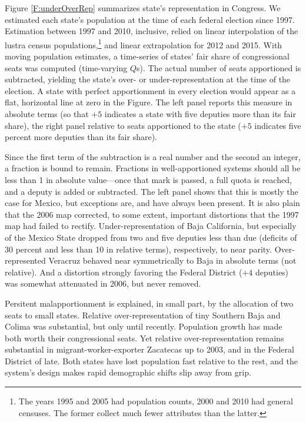 \documentclass[letter,12pt]{article}
\begin{document}
Figure \ref{F:underOverRep} summarizes state's representation in Congress. We estimated each state's population at the time of each federal election since 1997. Estimation between 1997 and 2010, inclusive, relied on linear interpolation of the lustra census populations,\footnote{The years 1995 and 2005 had population counts, 2000 and 2010 had general censuses. The former collect much fewer attributes than the latter.} and linear extrapolation for 2012 and 2015. With moving population estimates, a time-series of states' fair share of congressional seats was computed (time-varying $Q$s). The actual number of seats apportioned is subtracted, yielding the state's over- or under-representation at the time of the election. A state with perfect apportionment in every election would appear as a flat, horizontal line at zero in the Figure. The left panel reports this measure in absolute terms (so that $+5$ indicates a state with five deputies more than its fair share), the right panel relative to seats apportioned to the state ($+5$ indicates five percent more deputies than its fair share).  

Since the first term of the subtraction is a real number and the second an integer, a fraction is bound to remain. Fractions in well-apportioned systems should all be less than 1 in absolute value---once that mark is passed, a full quota is reached, and a deputy is added or subtracted. The left panel shows that this is mostly the case for Mexico, but exceptions are, and have always been present. It is also plain that the 2006 map corrected, to some extent, important distortions that the 1997 map had failed to rectify. Under-representation of Baja California, but especially of the Mexico State dropped from two and five deputies less than due (deficits of 30 percent and less than 10 in relative terms), respectively, to near parity. Over-represented Veracruz behaved near symmetrically to Baja in absolute terms (not relative). And a distortion strongly favoring the Federal District ($+4$ deputies) was somewhat attenuated in 2006, but never removed. 

Persitent malapportionment is explained, in small part, by the allocation of two seats to small states. Relative over-representation of tiny Southern Baja and Colima was substantial, but only until recently. Population growth has made both worth their congressional seats. Yet relative over-representation remains substantial in migrant-worker-exporter Zacatecas up to 2003, and in the Federal District of late. Both states have lost population fast relative to the rest, and the system's design makes rapid demographic shifts slip away from grip. 
\end{document}
